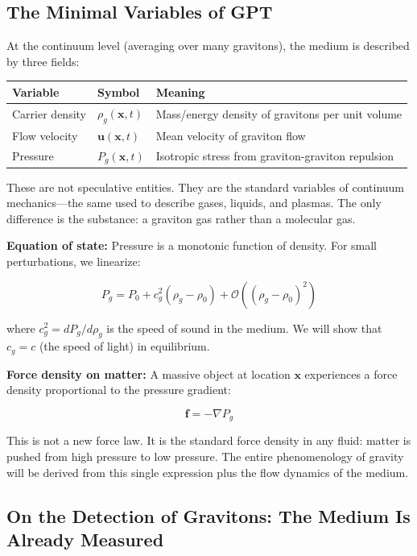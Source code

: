 \documentclass[12pt, a4paper]{article}
\begin{document}
\subsection{The Minimal Variables of GPT}
\label{subsec:minimal_variables}

At the continuum level (averaging over many gravitons), the medium is described by three fields:

\begin{center}
\begin{tabular}{|p{3cm}|p{3.5cm}|p{8cm}|}
\hline
\textbf{Variable} & \textbf{Symbol} & \textbf{Meaning} \\
\hline
Carrier density & \( \rho_g(\mathbf{x}, t) \) & Mass/energy density of gravitons per unit volume \\
\hline
Flow velocity & \( \mathbf{u}(\mathbf{x}, t) \) & Mean velocity of graviton flow \\
\hline
Pressure & \( P_g(\mathbf{x}, t) \) & Isotropic stress from graviton-graviton repulsion \\
\hline
\end{tabular}
\end{center}

These are not speculative entities. They are the standard variables of continuum mechanics—the same used to describe gases, liquids, and plasmas. The only difference is the substance: a graviton gas rather than a molecular gas.

\textbf{Equation of state:} Pressure is a monotonic function of density. For small perturbations, we linearize:

\[
P_g = P_0 + c_g^2 (\rho_g - \rho_0) + \mathcal{O}((\rho_g - \rho_0)^2)
\]

where \( c_g^2 = dP_g/d\rho_g \) is the speed of sound in the medium. We will show that \( c_g = c \) (the speed of light) in equilibrium.

\textbf{Force density on matter:} A massive object at location \( \mathbf{x} \) experiences a force density proportional to the pressure gradient:

\[
\mathbf{f} = -\nabla P_g
\]

This is not a new force law. It is the standard force density in any fluid: matter is pushed from high pressure to low pressure. The entire phenomenology of gravity will be derived from this single expression plus the flow dynamics of the medium.

\subsection{On the Detection of Gravitons: The Medium Is Already Measured}
\label{subsec:graviton_detection}
\end{document}

